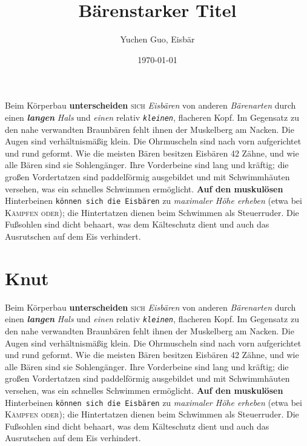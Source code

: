 \documentclass{article}
\title{Bärenstarker Titel}
\author{Yuchen Guo, Eisbär}
\date{\today}
\begin{document}
\maketitle
\tableofcontents
\newpage
\blindtext

Beim Körperbau \textbf{unterscheiden} \textsc{sich} \emph{Eisbären}
von \textsf{anderen} \textit{Bärenarten} durch einen
\textbf{\textit{langen}} \textsl{\textit{Hals}} und
\textsf{\textit{einen}} relativ \texttt{\textit{kleinen}}, {\Huge
  flacheren} {\tiny Kopf}. Im {\LARGE Gegensatz} zu den nahe
verwandten Braunbären fehlt ihnen der Muskelberg am Nacken. Die Augen
sind verhältnismäßig klein. Die Ohrmuscheln sind nach vorn
aufgerichtet und rund geformt. Wie die meisten Bären besitzen Eisbären
42 Zähne, und wie alle Bären sind sie Sohlengänger. Ihre Vorderbeine
sind lang und kräftig; die großen Vordertatzen sind paddelförmig
ausgebildet und mit Schwimmhäuten versehen, was ein schnelles
Schwimmen ermöglicht. \textbf{\Huge Auf den muskulösen} Hinterbeinen
\texttt{\tiny können sich die Eisbären} zu \textit{\LARGE maximaler Höhe erheben} (etwa
bei \textsc{\huge Kämpfen oder}); die Hintertatzen
dienen beim Schwimmen als Steuerruder. Die Fußsohlen sind dicht
behaart, was dem Kälteschutz dient und auch das Ausrutschen auf dem
Eis verhindert. 

\section{Knut}
\blindtext

Beim Körperbau \textbf{unterscheiden} \textsc{sich} \emph{Eisbären}
von \textsf{anderen} \textit{Bärenarten} durch einen
\textbf{\textit{langen}} \textsl{\textit{Hals}} und
\textsf{\textit{einen}} relativ \texttt{\textit{kleinen}}, {\Huge
  flacheren} {\tiny Kopf}. Im {\LARGE Gegensatz} zu den nahe
verwandten Braunbären fehlt ihnen der Muskelberg am Nacken. Die Augen
sind verhältnismäßig klein. Die Ohrmuscheln sind nach vorn
aufgerichtet und rund geformt. Wie die meisten Bären besitzen Eisbären
42 Zähne, und wie alle Bären sind sie Sohlengänger. Ihre Vorderbeine
sind lang und kräftig; die großen Vordertatzen sind paddelförmig
ausgebildet und mit Schwimmhäuten versehen, was ein schnelles
Schwimmen ermöglicht. \textbf{\Huge Auf den muskulösen} Hinterbeinen
\texttt{\tiny können sich die Eisbären} zu \textit{\LARGE maximaler Höhe erheben} (etwa
bei \textsc{\huge Kämpfen oder}); die Hintertatzen
dienen beim Schwimmen als Steuerruder. Die Fußsohlen sind dicht
behaart, was dem Kälteschutz dient und auch das Ausrutschen auf dem
Eis verhindert. 
\end{document}
